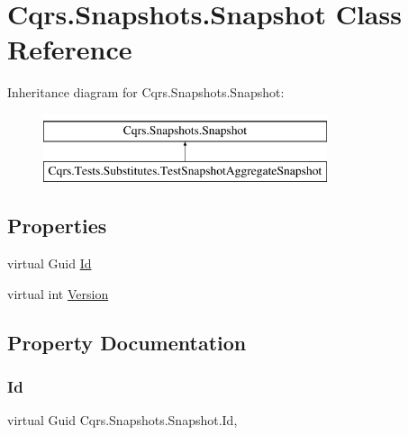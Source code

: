 \hypertarget{classCqrs_1_1Snapshots_1_1Snapshot}{}\section{Cqrs.\+Snapshots.\+Snapshot Class Reference}
\label{classCqrs_1_1Snapshots_1_1Snapshot}
Inheritance diagram for Cqrs.\+Snapshots.\+Snapshot\+:\begin{figure}[H]
\begin{center}
\leavevmode
\includegraphics[height=2.000000cm]{classCqrs_1_1Snapshots_1_1Snapshot}
\end{center}
\end{figure}
\subsection*{Properties}
\begin{DoxyCompactItemize}
\item 
virtual Guid \hyperlink{classCqrs_1_1Snapshots_1_1Snapshot_a0da54bdfa43e46a17f6e6aa88d1f3b67}{Id}
\item 
virtual int \hyperlink{classCqrs_1_1Snapshots_1_1Snapshot_a59c0a399430e5f4a1b27d999c3bb5d4f}{Version}
\end{DoxyCompactItemize}


\subsection{Property Documentation}
\mbox{\label{classCqrs_1_1Snapshots_1_1Snapshot_a0da54bdfa43e46a17f6e6aa88d1f3b67}} 
\subsubsection{\texorpdfstring{Id}{Id}}
{\footnotesize\ttfamily virtual Guid Cqrs.\+Snapshots.\+Snapshot.\+Id\hspace{0.3cm}{\ttfamily [get]}, {\ttfamily [set]}}

